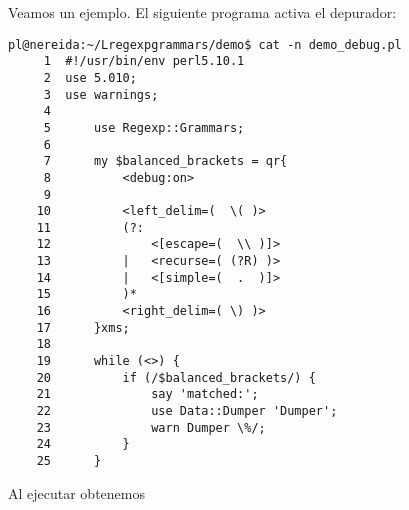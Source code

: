 Veamos un ejemplo. El siguiente programa activa el depurador:
\begin{verbatim}
pl@nereida:~/Lregexpgrammars/demo$ cat -n demo_debug.pl
     1  #!/usr/bin/env perl5.10.1
     2  use 5.010;
     3  use warnings;
     4
     5      use Regexp::Grammars;
     6
     7      my $balanced_brackets = qr{
     8          <debug:on>
     9
    10          <left_delim=(  \( )>
    11          (?:
    12              <[escape=(  \\ )]>
    13          |   <recurse=( (?R) )>
    14          |   <[simple=(  .  )]>
    15          )*
    16          <right_delim=( \) )>
    17      }xms;
    18
    19      while (<>) {
    20          if (/$balanced_brackets/) {
    21              say 'matched:';
    22              use Data::Dumper 'Dumper';
    23              warn Dumper \%/;
    24          }
    25      }
\end{verbatim}
Al ejecutar obtenemos
